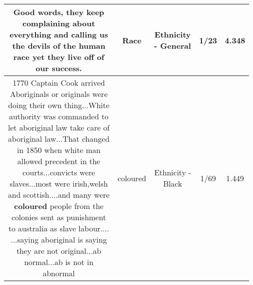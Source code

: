 \documentclass[11pt]{article}
\newlength\mylength
\begin{document}
\begin{center}
\begin{longtable}{|C{.65\mylength}|C{.30\mylength}|C{.12\mylength}|C{.12\mylength}|C{.12\mylength}|}
  \small Good words, they keep complaining about everything and calling us the devils of the human \textbf{race} yet they live off of our success.\normalsize   & Race & Ethnicity - General & 1/23 & 4.348 \\  \hline
  \small 1770 Captain Cook arrived    Aboriginals or originals were doing their own thing...White authority was commanded to let aboriginal law take care of aboriginal law...That changed in 1850 when white man allowed precedent in the courts...convicts were slaves...most were irish,welsh and scottish....and many were \textbf{coloured} people from the colonies sent as punishment to australia as slave labour.... ...saying aboriginal is saying they are not original...ab normal...ab is not in abnormal\normalsize   & coloured & Ethnicity - Black & 1/69 & 1.449 \\  \hline

\end{longtable}
\end{center}
\end{document}
